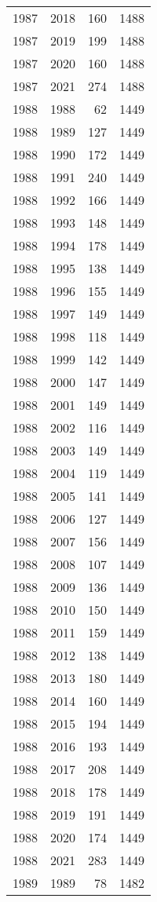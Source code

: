 \documentclass[
  10pt,
  letterpaper,
  DIV=11,
  numbers=noendperiod,
  twoside]{scrartcl}
\begin{document}
\begin{longtable}[]{@{}rrrr@{}}
1987 & 2018 & 160 & 1488 \\
1987 & 2019 & 199 & 1488 \\
1987 & 2020 & 160 & 1488 \\
1987 & 2021 & 274 & 1488 \\
1988 & 1988 & 62 & 1449 \\
1988 & 1989 & 127 & 1449 \\
1988 & 1990 & 172 & 1449 \\
1988 & 1991 & 240 & 1449 \\
1988 & 1992 & 166 & 1449 \\
1988 & 1993 & 148 & 1449 \\
1988 & 1994 & 178 & 1449 \\
1988 & 1995 & 138 & 1449 \\
1988 & 1996 & 155 & 1449 \\
1988 & 1997 & 149 & 1449 \\
1988 & 1998 & 118 & 1449 \\
1988 & 1999 & 142 & 1449 \\
1988 & 2000 & 147 & 1449 \\
1988 & 2001 & 149 & 1449 \\
1988 & 2002 & 116 & 1449 \\
1988 & 2003 & 149 & 1449 \\
1988 & 2004 & 119 & 1449 \\
1988 & 2005 & 141 & 1449 \\
1988 & 2006 & 127 & 1449 \\
1988 & 2007 & 156 & 1449 \\
1988 & 2008 & 107 & 1449 \\
1988 & 2009 & 136 & 1449 \\
1988 & 2010 & 150 & 1449 \\
1988 & 2011 & 159 & 1449 \\
1988 & 2012 & 138 & 1449 \\
1988 & 2013 & 180 & 1449 \\
1988 & 2014 & 160 & 1449 \\
1988 & 2015 & 194 & 1449 \\
1988 & 2016 & 193 & 1449 \\
1988 & 2017 & 208 & 1449 \\
1988 & 2018 & 178 & 1449 \\
1988 & 2019 & 191 & 1449 \\
1988 & 2020 & 174 & 1449 \\
1988 & 2021 & 283 & 1449 \\
1989 & 1989 & 78 & 1482 \\

\end{longtable}
\end{document}
